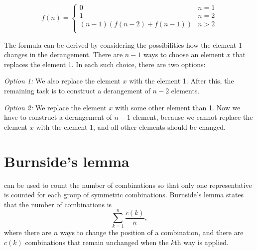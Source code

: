 \begin{equation*}
    f(n) = \begin{cases}
               0               & n = 1\\
               1               & n = 2\\
               (n-1)(f(n-2) + f(n-1)) & n>2 \\
           \end{cases}
\end{equation*}

The formula can be derived by considering
the possibilities how the element 1 changes
in the derangement.
There are $n-1$ ways to choose an element $x$
that replaces the element 1.
In each such choice, there are two options:

\textit{Option 1:} We also replace the element $x$
with the element 1.
After this, the remaining task is to construct
a derangement of $n-2$ elements.

\textit{Option 2:} We replace the element $x$
with some other element than 1.
Now we have to construct a derangement
of $n-1$ element, because we cannot replace
the element $x$ with the element $1$, and all other
elements should be changed.

\section{Burnside's lemma}


can be used to count
the number of combinations so that
only one representative is counted
for each group of symmetric combinations.
Burnside's lemma states that the number of
combinations is
\[\sum_{k=1}^n \frac{c(k)}{n},\]
where there are $n$ ways to change the
position of a combination,
and there are $c(k)$ combinations that
remain unchanged when the $k$th way is applied.

